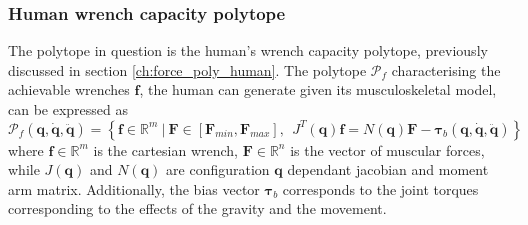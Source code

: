 \subsubsection{Human wrench capacity polytope}
The polytope in question is the human's wrench capacity polytope, previously discussed in section \ref{ch:force_poly_human}. The polytope $\mathcal{P}_f$ characterising the achievable wrenches $\bm{f}$, the human can generate given its musculoskeletal model, can be expressed as 
\begin{equation}
    \mathcal{P}_f(\bm{q},\dot{\bm{q}},\ddot{\bm{q}}) = \left\{ \bm{f} \in \mathbb{R}^m ~|~ \bm{F}\in\left[\bm{F}_{min}, \bm{F}_{max} \right], ~~ \!J^T(\bm{q})\bm{f} =\! N(\bm{q})\bm{F} -\bm{\tau}_b(\bm{q},\dot{\bm{q}},\ddot{\bm{q}}) \right\}
    \label{eq:human_force_poly_revisit2}
\end{equation}
where $\bm{f}\in\mathbb{R}^m$ is the cartesian wrench, $\bm{F}\in\mathbb{R}^n$ is the vector of muscular forces, while $J(\bm{q})$ and $N(\bm{q})$ are configuration $\bm{q}$ dependant jacobian and moment arm matrix. Additionally, the bias vector $\bm{\tau}_b$ corresponds to the joint torques corresponding to the effects of the gravity and the movement. 

